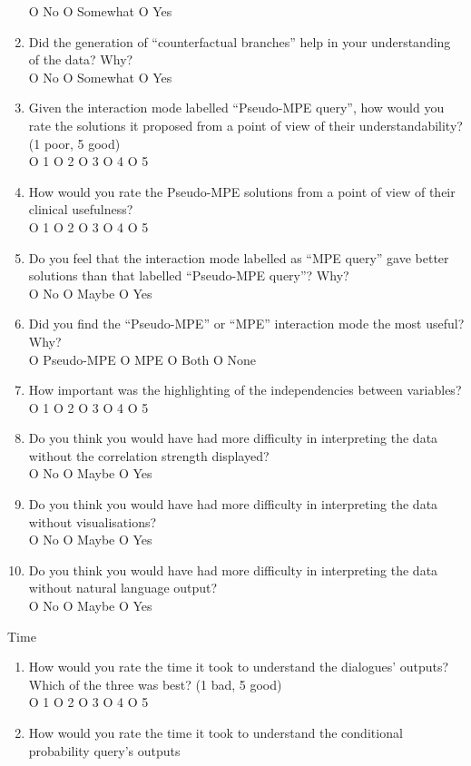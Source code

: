 \begin{framed}
\begin{enumerate}[resume]
		O No O Somewhat O Yes
		\item Did the generation of \enquote{counterfactual branches} help in your understanding of the data?  Why? \\
		O No O Somewhat O Yes
		\item Given the interaction mode labelled \enquote{Pseudo-MPE query}, how would you rate the solutions it proposed from a point of view of their understandability? (1 poor, 5 good) \\
		O 1 O 2 O 3 O 4 O 5
		\item How would you rate the Pseudo-MPE solutions from a point of view of their clinical usefulness? \\
		O 1 O 2 O 3 O 4 O 5
		\item Do you feel that the interaction mode labelled as \enquote{MPE query} gave better solutions than that labelled \enquote{Pseudo-MPE query}?  Why? \\
		O No O Maybe O Yes
		\item Did you find the \enquote{Pseudo-MPE} or \enquote{MPE} interaction mode the most useful?  Why? \\
		O Pseudo-MPE O MPE O Both O None
		\item How important was the highlighting of the independencies between variables? \\
		O 1 O 2 O 3 O 4 O 5
		\item Do you think you would have had more difficulty in interpreting the data without the correlation strength displayed? \\
		O No O Maybe O Yes
		\item Do you think you would have had more difficulty in interpreting the data without visualisations? \\
		O No O Maybe O Yes
		\item Do you think you would have had more difficulty in interpreting the data without natural language output? \\
		O No O Maybe O Yes
	\end{enumerate}
	{\Large Time}
	\begin{enumerate}[resume]
		\item How would you rate the time it took to understand the dialogues' outputs?  Which of the three was best? (1 bad, 5 good) \\
		O 1 O 2 O 3 O 4 O 5
		\item How would you rate the time it took to understand the conditional probability query's outputs \\

\end{enumerate}
\end{framed}
